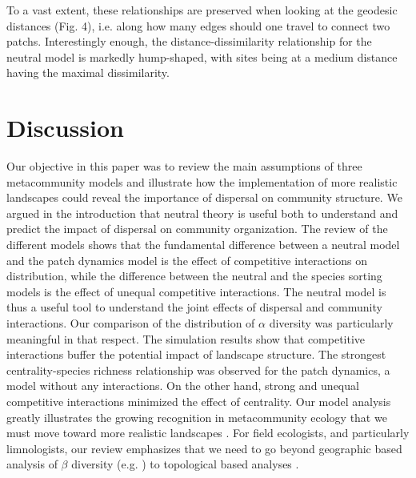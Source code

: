\documentclass[12pt]{article}
\begin{document}
To a vast extent, these relationships are preserved when looking at the
geodesic distances (Fig. 4), i.e. along how many edges should one travel to
connect two patchs. Interestingly enough, the distance-dissimilarity
relationship for the neutral model is markedly hump-shaped, with sites being at
a medium distance having the maximal dissimilarity.

\section*{Discussion}

Our objective in this paper was to review the main assumptions of three
metacommunity models and illustrate how the implementation of more realistic
landscapes could reveal the importance of dispersal on community structure. We
argued in the introduction that neutral theory is useful both to understand and
predict the impact of dispersal on community organization. The review of the
different models shows that the fundamental difference between a neutral model
and the patch dynamics model is the effect of competitive interactions on
distribution, while the difference between the neutral and the species sorting
models is the effect of unequal competitive interactions. The neutral model is
thus a useful tool to understand the joint effects of dispersal and community
interactions. Our comparison of the distribution of $\alpha$ diversity was
particularly meaningful in that respect. The simulation results show that
competitive interactions buffer the potential impact of landscape structure. The
strongest centrality-species richness relationship was observed for the patch
dynamics, a model without any interactions. On the other hand, strong and
unequal competitive interactions minimized the effect of centrality. Our model
analysis greatly illustrates the growing recognition in metacommunity ecology
that we must move toward more realistic landscapes \parencite{Gilarranz2012}.
For field ecologists, and particularly limnologists, our review emphasizes that
we need to go beyond geographic based analysis of $\beta$ diversity (e.g.
\parencite{Legendre2005}) to topological based analyses
\parencite{Peterson2013}.
\end{document}
